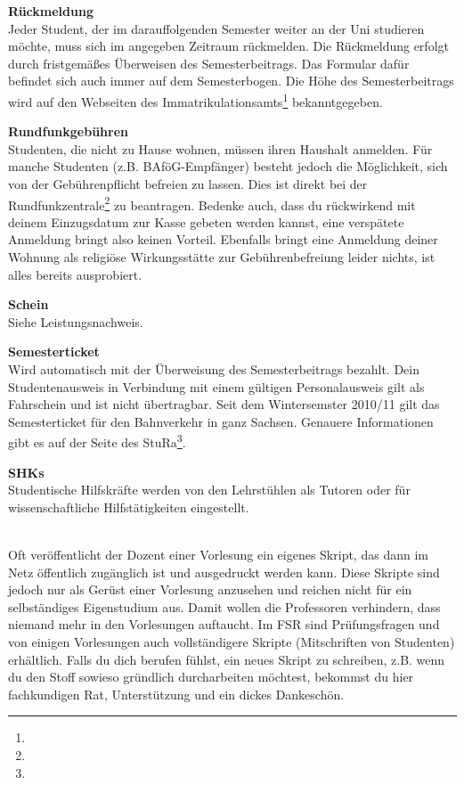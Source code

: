 \textbf{Rückmeldung} \\
Jeder Student, der im darauffolgenden Semester weiter an der Uni studieren möchte, muss sich im angegeben Zeitraum rückmelden.
Die Rückmeldung erfolgt durch fristgemäßes Überweisen des Semesterbeitrags.
Das Formular dafür befindet sich auch immer auf dem Semesterbogen.
Die Höhe des Semesterbeitrags wird auf den Webseiten des Immatrikulationsamts\footnote{} bekanntgegeben.

\textbf{Rundfunkgebühren} \\
Studenten, die nicht zu Hause wohnen, müssen ihren Haushalt anmelden.
Für manche Studenten (z.B. BAföG-Empfänger) besteht jedoch die Möglichkeit, sich von der Gebührenpflicht befreien zu lassen.
Dies ist direkt bei der Rundfunkzentrale\footnote{} zu beantragen.
Bedenke auch, dass du rückwirkend mit deinem Einzugsdatum zur Kasse gebeten werden kannst, eine verspätete Anmeldung bringt also keinen Vorteil.
Ebenfalls bringt eine Anmeldung deiner Wohnung als religiöse Wirkungsstätte zur Gebührenbefreiung leider nichts, ist alles bereits ausprobiert.

\textbf{Schein} \\
Siehe Leistungsnachweis.

\textbf{Semesterticket} \\
Wird automatisch mit der Überweisung des Semesterbeitrags bezahlt.
Dein Studentenausweis in Verbindung mit einem gültigen Personalausweis gilt als Fahrschein und ist nicht übertragbar.
Seit dem Wintersemster 2010/11 gilt das Semesterticket für den Bahnverkehr in ganz Sachsen.
Genauere Informationen gibt es auf der Seite des StuRa\footnote{}.


\textbf{SHKs} \\
Studentische Hilfskräfte werden von den Lehrstühlen als Tutoren oder für wissenschaftliche Hilfstätigkeiten eingestellt.

 \\
Oft veröffentlicht der Dozent einer Vorlesung ein eigenes Skript, das dann im Netz öffentlich zugänglich ist und ausgedruckt werden kann.
Diese Skripte sind jedoch nur als Gerüst einer Vorlesung anzusehen und reichen nicht für ein selbständiges Eigenstudium aus.
Damit wollen die Professoren verhindern, dass niemand mehr in den Vorlesungen auftaucht.
Im FSR sind Prüfungsfragen und von einigen Vorlesungen auch vollständigere Skripte (Mitschriften von Studenten) erhältlich.
Falls du dich berufen fühlst, ein neues Skript zu schreiben, z.B. wenn du den Stoff sowieso gründlich durcharbeiten möchtest, bekommst du hier fachkundigen Rat, Unterstützung und ein dickes Dankeschön.

